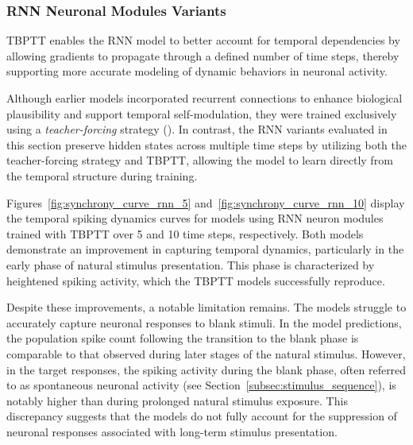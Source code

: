 \subsubsection{RNN Neuronal Modules Variants}
\label{{subsubsec:rnn_eval}}

 TBPTT enables the RNN model to better account for temporal dependencies by allowing gradients to propagate through a defined number of time steps, thereby supporting more accurate modeling of dynamic behaviors in neuronal activity.

Although earlier models incorporated recurrent connections to enhance biological plausibility and support temporal self-modulation, they were trained exclusively using a \emph{teacher-forcing} strategy (\citet{NIPS2016_16026d60}). In contrast, the RNN variants evaluated in this section preserve hidden states across multiple time steps by utilizing both the teacher-forcing strategy and TBPTT, allowing the model to learn directly from the temporal structure during training.

Figures~\ref{fig:synchrony_curve_rnn_5} and~\ref{fig:synchrony_curve_rnn_10} display the temporal spiking dynamics curves for models using RNN neuron modules trained with TBPTT over 5 and 10 time steps, respectively. Both models demonstrate an improvement in capturing temporal dynamics, particularly in the early phase of natural stimulus presentation. This phase is characterized by heightened spiking activity, which the TBPTT models successfully reproduce.

Despite these improvements, a notable limitation remains. The models struggle to accurately capture neuronal responses to blank stimuli. In the model predictions, the population spike count following the transition to the blank phase is comparable to that observed during later stages of the natural stimulus. However, in the target responses, the spiking activity during the blank phase, often referred to as spontaneous neuronal activity (see Section~\ref{subsec:stimulus_sequence}), is notably higher than during prolonged natural stimulus exposure. This discrepancy suggests that the models do not fully account for the suppression of neuronal responses associated with long-term stimulus presentation.

